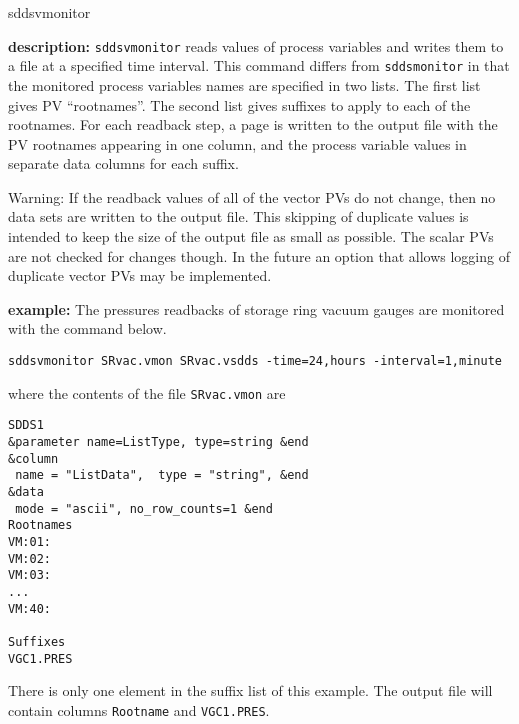 \begin{sddsprog}{sddsvmonitor}
\item \textbf{description:}
\verb+sddsvmonitor+ reads values of process variables and writes them to a file at a specified time interval.
This command differs from \verb+sddsmonitor+ in that the monitored
process variables names are specified in two lists.  The first list
gives PV ``rootnames''.  The second list gives suffixes to apply to
each of the rootnames. For each readback step, a page is written to
the output file with the PV rootnames appearing in one column, and the
process variable values in separate data columns for each suffix.

Warning: If the readback values of all of the vector PVs do not
change, then no data sets are written to the output file. This
skipping of duplicate values is intended to keep the size of the
output file as small as possible.  The scalar PVs are not checked for
changes though. In the future an option that allows logging of duplicate
vector PVs may be implemented.

\item \textbf{example:} 
% 
The pressures readbacks of storage ring vacuum gauges are monitored with the command below.
\begin{verbatim}
sddsvmonitor SRvac.vmon SRvac.vsdds -time=24,hours -interval=1,minute
\end{verbatim}
where the contents of the file \verb+SRvac.vmon+ are
\begin{verbatim}
SDDS1
&parameter name=ListType, type=string &end
&column
 name = "ListData",  type = "string", &end
&data
 mode = "ascii", no_row_counts=1 &end
Rootnames
VM:01:
VM:02:
VM:03:
...
VM:40:

Suffixes
VGC1.PRES
\end{verbatim}
There is only one element in the suffix list of this example. The output file will contain columns
\verb+Rootname+ and \verb+VGC1.PRES+.


\end{sddsprog}
